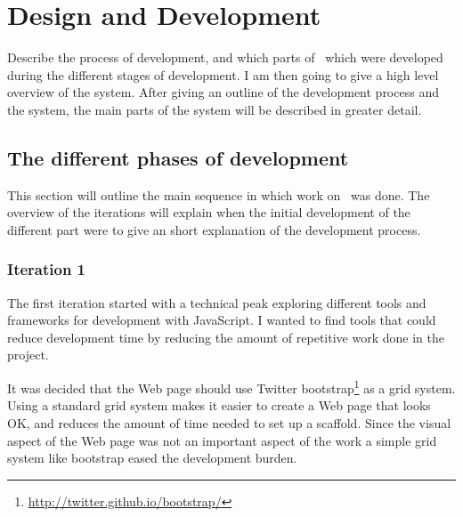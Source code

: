 
\chapter{Design and Development} %

\label{DesignAndDevelopment} %



Describe the process of development,
and which parts of \theartefact\ which were developed during the different stages of development.
I am then going to give a high level overview of the system.
After giving an outline of the development process and the system,
the main parts of the system will be described in greater detail.

\section{The different phases of development}
This section will outline the main sequence in which work on \theartefact\ was done.
The overview of the iterations will explain when the initial development of
the different part were to give an short explanation of the development process.

\subsection{Iteration 1}
The first iteration started with a technical peak exploring different tools and frameworks for development with JavaScript.
I wanted to find tools that could reduce development time by reducing the amount of repetitive work done in the project.

It was decided that the Web page should use Twitter bootstrap\footnote{\url{http://twitter.github.io/bootstrap/}} as a grid system.
Using a standard grid system makes it easier to create a Web page that looks OK,
and reduces the amount of time needed to set up a scaffold.
Since the visual aspect of the Web page was not an important aspect of the work a simple grid system like bootstrap
eased the development burden.

